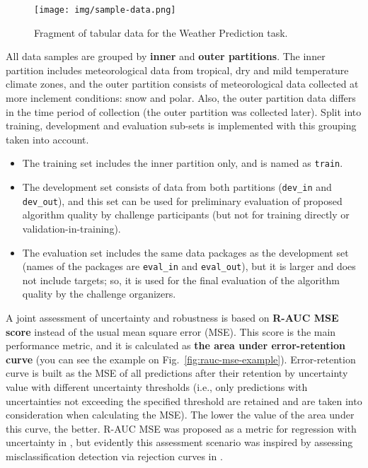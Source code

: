 \documentclass{article}
\begin{document}
\begin{figure*}[hbt!]
 \centering
\begin{minipage}[h]{0.8\linewidth}
  \centering
  \centerline{\texttt{[image: img/sample-data.png]}}
  \vspace{-0.1cm}
\end{minipage}
 \caption{Fragment of tabular data for the Weather Prediction task.}
 \label{fig:sample-data}
\end{figure*}

All data samples are grouped by \textbf{inner} and \textbf{outer partitions}. The inner partition includes meteorological data from tropical, dry and mild temperature climate zones, and the outer partition consists of meteorological data collected at more inclement conditions: snow and polar. Also, the outer partition data differs in the time period of collection (the outer partition was collected later). Split into training, development and evaluation sub-sets is implemented with this grouping taken into account.

\begin{itemize}
  \item The training set includes the inner partition only, and is named as \verb+train+.
  \item The development set consists of data from both partitions (\verb+dev_in+ and \verb+dev_out+), and this set can be used for preliminary evaluation of proposed algorithm quality by challenge participants (but not for training directly or validation-in-training).
  \item The evaluation set includes the same data packages as the development set (names of the packages are \verb+eval_in+ and \verb+eval_out+), but it is larger and does not include targets; so, it is used for the final evaluation of the algorithm quality by the challenge organizers.
\end{itemize}

A joint assessment of uncertainty and robustness is based on \textbf{R-AUC MSE score} instead of the usual mean square error (MSE). This score is the main performance metric, and it is calculated as \textbf{the area under error-retention curve} (you can see the example on Fig.~\ref{fig:rauc-mse-example}). Error-retention curve is built as the MSE of all predictions after their retention by uncertainty value with different uncertainty thresholds (i.e., only predictions with uncertainties not exceeding the specified threshold are retained and are taken into consideration when calculating the MSE). The lower the value of the area under this curve, the better. R-AUC MSE was proposed as a metric for regression with uncertainty in \cite{Malinin2021shifts}, but evidently this assessment scenario was inspired by assessing misclassification detection via rejection curves in \cite{Malinin2019thesis}.
\end{document}
